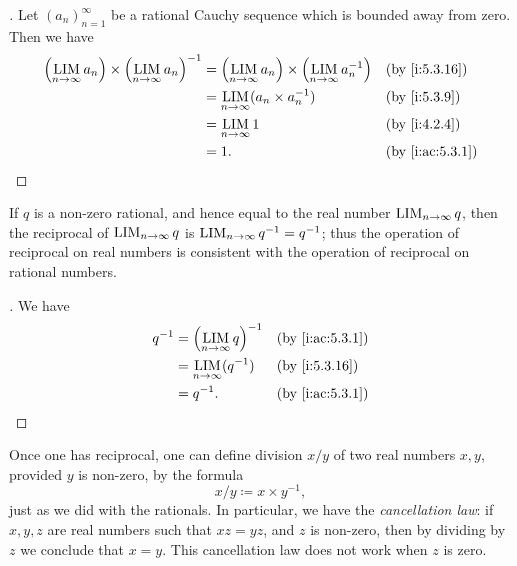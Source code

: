 \begin{proof}[]
  Let \((a_n)_{n = 1}^\infty\) be a rational Cauchy sequence which is bounded away from zero.
  Then we have
  \begin{align*}
    \pa{\LIM_{n \to \infty} a_n} \times \pa{\LIM_{n \to \infty} a_n}^{-1} & = \pa{\LIM_{n \to \infty} a_n} \times \pa{\LIM_{n \to \infty} a_n^{-1}} &  & \by{i:5.3.16}   \\
                                                                          & = \LIM_{n \to \infty} (a_n \times a_n^{-1})                             &  & \by{i:5.3.9}    \\
                                                                          & = \LIM_{n \to \infty} 1                                                 &  & \by{i:4.2.4}    \\
                                                                          & = 1.                                                                    &  & \by{i:ac:5.3.1}
  \end{align*}
\end{proof}

\begin{ac}\label{i:ac:5.3.4}
  If \(q\) is a non-zero rational, and hence equal to the real number \(\operatorname*{LIM}_{n \to \infty} q\), then the reciprocal of \(\operatorname*{LIM}_{n \to \infty} q\) is \(\operatorname*{LIM}_{n \to \infty} q^{-1} = q^{-1}\);
  thus the operation of reciprocal on real numbers is consistent with the operation of reciprocal on rational numbers.
\end{ac}

\begin{proof}[]
  We have
  \begin{align*}
    q^{-1} & = \pa{\LIM_{n \to \infty} q}^{-1} &  & \by{i:ac:5.3.1} \\
           & = \LIM_{n \to \infty} (q^{-1})    &  & \by{i:5.3.16}   \\
           & = q^{-1}.                         &  & \by{i:ac:5.3.1}
  \end{align*}
\end{proof}

\begin{ac}\label{i:ac:5.3.5}
  Once one has reciprocal, one can define division \(x / y\) of two real numbers \(x, y\), provided \(y\) is non-zero, by the formula
  \[
    x / y \coloneqq x \times y^{-1},
  \]
  just as we did with the rationals.
  In particular, we have the \emph{cancellation law}:
  if \(x, y, z\) are real numbers such that \(xz = yz\), and \(z\) is non-zero, then by dividing by \(z\) we conclude that \(x = y\).
  This cancellation law does not work when \(z\) is zero.
\end{ac}

